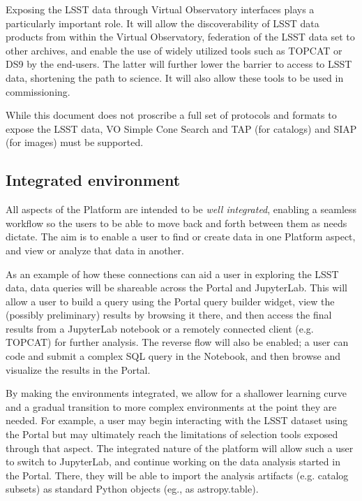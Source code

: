 \documentclass[DM,lsstdraft,toc]{lsstdoc}
\begin{document}
Exposing the LSST data through Virtual Observatory interfaces plays a particularly 
important role. It will allow the discoverability of LSST data products from within
the Virtual Observatory, federation of the LSST data set to other
archives, and enable the use of widely utilized tools such as TOPCAT or DS9 by the
end-users. The latter will further lower the barrier to access to LSST data, 
shortening the path to science. It will also allow these tools to be used in commissioning.

While this document does not proscribe a full set of protocols and formats
to expose the LSST data, VO Simple Cone Search and TAP (for catalogs) and
SIAP (for images) must be supported.

\subsection{Integrated environment}

All aspects of the Platform are intended to be {\it well integrated}, enabling a seamless workflow so the users to be able to move back and forth between them as needs dictate.  The aim is to enable a user to find or create data in one Platform aspect, and view or analyze that data in another.

As an example of how these connections can aid a user in exploring the LSST data, data queries will be shareable across the Portal and JupyterLab. This will allow a user to build a query using the Portal query builder widget, view the (possibly preliminary) results by browsing it there, and then access the final results from a JupyterLab notebook or a remotely connected client (e.g. TOPCAT) for further analysis. The reverse flow will also be enabled; a user can code and submit a complex SQL query in the Notebook, and then browse and visualize the results in the Portal.

By making the environments integrated, we allow for a shallower learning curve and a gradual transition to more complex environments at the point they are needed. For example, a user may begin interacting with the LSST dataset using the Portal but may ultimately reach the limitations of selection tools exposed through that aspect. The integrated nature of the platform will allow such a user to switch to JupyterLab, and continue working on the data analysis started in the Portal. There, they will be able to import the analysis artifacts (e.g. catalog subsets) as standard Python objects (eg., as astropy.table).
\end{document}
